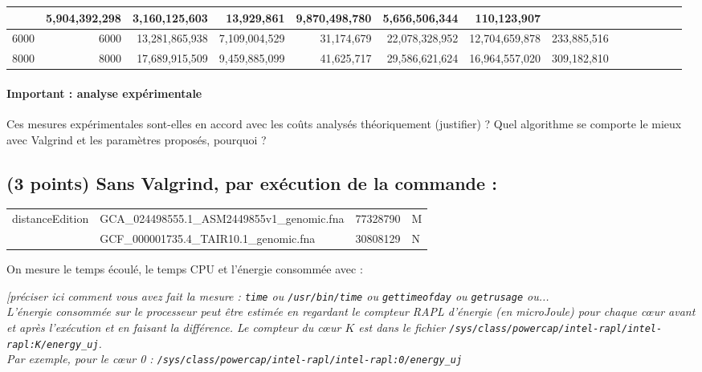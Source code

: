 \documentclass[10pt,a4paper]{article}
\begin{document}
{\begin{tabular}{|r|r||r|r|r||r|r|r||r|r|r||r|r|r||}
& 5,904,392,298 & 3,160,125,603  & 13,929,861 %
&  9,870,498,780 & 5,656,506,344 & 110,123,907  %
\\ \hline
6000 & 6000 

& 13,281,865,938 &  7,109,004,529 & 31,174,679  %
& 22,078,328,952 & 12,704,659,878  & 233,885,516  %
\\ \hline
8000 & 8000 

& 17,689,915,509 & 9,459,885,099 & 41,625,717  %
& 29,586,621,624 & 16,964,557,020 & 309,182,810  %
\\ \hline
\hline
\end{tabular}


\paragraph{Important : analyse expérimentale}
Ces mesures expérimentales sont-elles en accord avec les coûts analysés théoriquement (justifier) ? 
Quel algorithme se comporte le mieux avec Valgrind et les paramètres proposés, pourquoi ?

\subsection{(3 points) Sans Valgrind, par exécution de la commande :}
{\tt \begin{tabular}{llll}
distanceEdition & GCA\_024498555.1\_ASM2449855v1\_genomic.fna & 77328790 & M \\
                & GCF\_000001735.4\_TAIR10.1\_genomic.fna     & 30808129 & N
\end{tabular}}

On mesure le temps écoulé, le temps CPU et l'énergie consommée avec : {\em [préciser ici comment vous avez fait la mesure :
{\tt time} 
ou {\tt /usr/bin/time}
ou {\tt gettimeofday}
ou {\tt getrusage}
ou... \\
L'énergie consommée sur le processeur peut être estimée en regardant le compteur RAPL d'énergie (en microJoule)
pour chaque cœur avant et après l'exécution et en faisant la différence.
Le compteur du cœur $K$ est dans le fichier \verb+/sys/class/powercap/intel-rapl/intel-rapl:K/energy_uj+.\\
Par exemple, pour le cœur 0 : \verb+/sys/class/powercap/intel-rapl/intel-rapl:0/energy_uj+

}}
\end{document}
